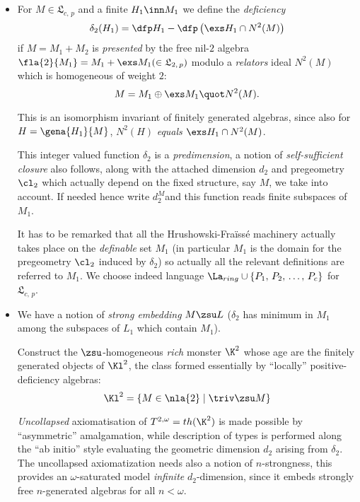 \documentclass[a4paper,11pt,german,english]{report}
\newcommand{\nl}[1]{\mathfrak{L}_{#1,\,p}}
\begin{document}
\begin{itemize}
\item[]%
For $M\in\mathfrak{L}_{c,\,p}$ and a finite $H_{1}\inn M_{1}$ we define the {\em deficiency}
$$\delta_{2}(H_{1})=\dfp H_{1}-\dfp\left(
\exs H_{1}\cap N^{2}(M)\right)$$
if $M=M_{1}+M_{2}$ is {\em presented} by the free nil-$2$
algebra $\fla{2}{M_{1}}=M_{1}+\exs M_{1}(\in\mathfrak{L}_{2,\,p})$ modulo a {\em relators} ideal $N^{2}(M)$
which is homogeneous of weight $2$:
$$M=M_{1}\oplus\exs M_{1}\quot N^{2}(M).$$


This is an isomorphism invariant of finitely generated algebras, since also
for $H=\gena{H_{1}}{M}$, $N^{2}(H)$ {\em equals} $\exs H_{1}\cap N^{2}(M)$.

This integer valued function $\delta_{2}$ is a {\em predimension}, a notion of {\em self-sufficient
closure} also follows, along with the attached dimension $d_{2}$ and pregeometry $\cl_{2}$ which actually
depend on the fixed structure, say $M$, we take into account. If needed hence write $d_{2}^{M}$and this
function reads finite subspaces of $M_{1}$. 

It has to be remarked that all the Hrushowski-Fra\"iss\'e machinery actually takes place on the {\em definable} set $M_{1}$
(in particular $M_{1}$ is the domain for the pregeometry $\cl_{2}$ induced by $\delta_{2}$)
so actually all the relevant definitions are referred to $M_{1}$. We choose indeed language
$\La_{ring}%
\cup\{P_{1},\,P_{2},\,\dots,\,P_{c}\}$ for $\nl{c}$.
\item[]We have a notion of {\em strong embedding} $M\zsu L$ ($\delta_{2}$ has minimum
in $M_{1}$ among the subspaces of $L_{1}$ which contain $M_{1}$).

Construct the $\zsu$-homogeneous {\em rich} monster $\K^{2}$ whose age are the finitely generated objects of $\Kl^{2}$, the class formed essentially by ``locally'' positive-deficiency algebras:
$$\Kl^{2}=\{M\in\nla{2}\mid \triv\zsu M\}$$

{\em Uncollapsed} axiomatisation of $T^{2,\omega}=th(\K^{2})$ is made possible by ``asymmetric'' amalgamation, while
description of types is performed along the ``ab initio'' style evaluating the geometric
dimension $d_{2}$ arising from $\delta_{2}$. The uncollapsed axiomatization needs also a notion
of $n$-strongness, this provides an $\omega$-saturated model {\em infinite}
$d_{2}$-dimension, since it embeds strongly free $n$-generated algebras for
all $n<\omega$.
\end{itemize}
\end{document}

